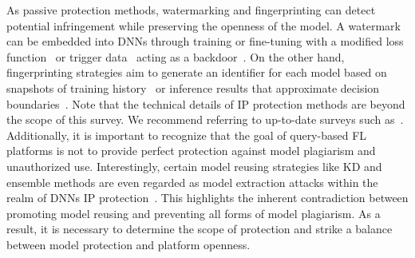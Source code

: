 As passive protection methods, watermarking and fingerprinting can detect potential infringement while preserving the openness of the model. 
A watermark can be embedded into DNNs through training or fine-tuning with a modified loss function~\cite{uchida2017embedding} or trigger data~\cite{darvish2019deepsigns} acting as a backdoor~\cite{bagdasaryan2020backdoor}.
On the other hand, fingerprinting strategies aim to generate an identifier for each model based on snapshots of training history~\cite{jia2021proof} or inference results that approximate decision boundaries~\cite{chen2022copy}.
Note that the technical details of IP protection methods are beyond the scope of this survey.
We recommend referring to up-to-date surveys such as~\cite{peng2022intellectual, sun2023deep}.
Additionally, it is important to recognize that the goal of query-based FL platforms is not to provide perfect protection against model plagiarism and unauthorized use.
Interestingly, certain model reusing strategies like KD and ensemble methods are even regarded as model extraction attacks within the realm of DNNs IP protection~\cite{charette2022cosine}.
This highlights the inherent contradiction between promoting model reusing and preventing all forms of model plagiarism.
As a result, it is necessary to determine the scope of protection and strike a balance between model protection and platform openness.

